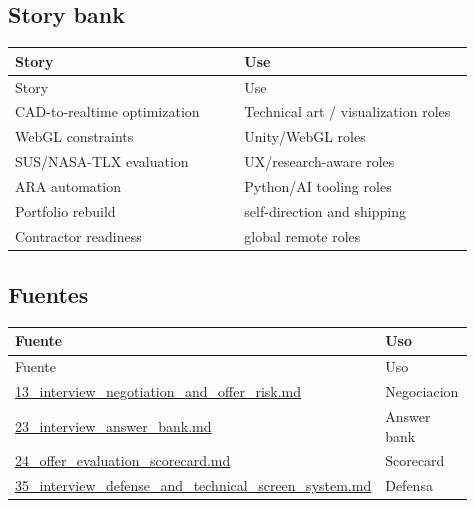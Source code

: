 \subsection{Story bank}


\begin{center}
\scriptsize
\begin{longtable}{>{\raggedright\arraybackslash}p{0.455\linewidth} >{\raggedright\arraybackslash}p{0.455\linewidth}}
\toprule
Story & Use \\
\midrule
\endfirsthead
\toprule
Story & Use \\
\midrule
\endhead
CAD-to-realtime optimization & Technical art / visualization roles \\
WebGL constraints & Unity/WebGL roles \\
SUS/NASA-TLX evaluation & UX/research-aware roles \\
ARA automation & Python/AI tooling roles \\
Portfolio rebuild & self-direction and shipping \\
Contractor readiness & global remote roles \\
\bottomrule
\end{longtable}
\end{center}


\subsection{Fuentes}


\begin{center}
\scriptsize
\begin{longtable}{>{\raggedright\arraybackslash}p{0.455\linewidth} >{\raggedright\arraybackslash}p{0.455\linewidth}}
\toprule
Fuente & Uso \\
\midrule
\endfirsthead
\toprule
Fuente & Uso \\
\midrule
\endhead
\href{file:///E:/Laboral/13_interview_negotiation_and_offer_risk.md}{13\_interview\_negotiation\_and\_offer\_risk.md} & Negociacion \\
\href{file:///E:/Laboral/23_interview_answer_bank.md}{23\_interview\_answer\_bank.md} & Answer bank \\
\href{file:///E:/Laboral/24_offer_evaluation_scorecard.md}{24\_offer\_evaluation\_scorecard.md} & Scorecard \\
\href{file:///E:/Laboral/35_interview_defense_and_technical_screen_system.md}{35\_interview\_defense\_and\_technical\_screen\_system.md} & Defensa \\
\bottomrule
\end{longtable}
\end{center}
